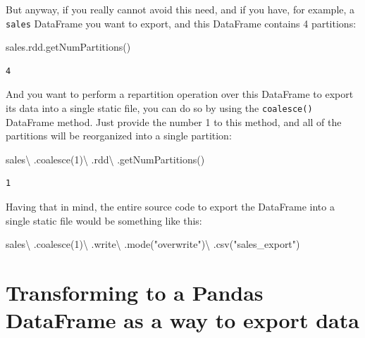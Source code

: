 \documentclass[
  11pt,
  letterpaper,
  DIV=11,
  numbers=noendperiod]{scrreprt}
\newenvironment{Shaded}{\begin{snugshade}}{\end{snugshade}}
\newcommand{\DecValTok}[1]{\textcolor[rgb]{0.68,0.00,0.00}{#1}}
\newcommand{\NormalTok}[1]{\textcolor[rgb]{0.00,0.23,0.31}{#1}}
\newcommand{\OperatorTok}[1]{\textcolor[rgb]{0.37,0.37,0.37}{#1}}
\newcommand{\StringTok}[1]{\textcolor[rgb]{0.13,0.47,0.30}{#1}}
\begin{document}
But anyway, if you really cannot avoid this need, and if you have, for
example, a \texttt{sales} DataFrame you want to export, and this
DataFrame contains 4 partitions:

\begin{Shaded}
\begin{Highlighting}[]
\NormalTok{sales.rdd.getNumPartitions()}
\end{Highlighting}
\end{Shaded}

\begin{verbatim}
4
\end{verbatim}

And you want to perform a repartition operation over this DataFrame to
export its data into a single static file, you can do so by using the
\texttt{coalesce()} DataFrame method. Just provide the number 1 to this
method, and all of the partitions will be reorganized into a single
partition:

\begin{Shaded}
\begin{Highlighting}[]
\NormalTok{sales}\OperatorTok{\textbackslash{}}
\NormalTok{    .coalesce(}\DecValTok{1}\NormalTok{)}\OperatorTok{\textbackslash{}}
\NormalTok{    .rdd}\OperatorTok{\textbackslash{}}
\NormalTok{    .getNumPartitions()}
\end{Highlighting}
\end{Shaded}

\begin{verbatim}
1
\end{verbatim}

Having that in mind, the entire source code to export the DataFrame into
a single static file would be something like this:

\begin{Shaded}
\begin{Highlighting}[]
\NormalTok{sales}\OperatorTok{\textbackslash{}}
\NormalTok{    .coalesce(}\DecValTok{1}\NormalTok{)}\OperatorTok{\textbackslash{}}
\NormalTok{    .write}\OperatorTok{\textbackslash{}}
\NormalTok{    .mode(}\StringTok{"overwrite"}\NormalTok{)}\OperatorTok{\textbackslash{}}
\NormalTok{    .csv(}\StringTok{"sales\_export"}\NormalTok{)}
\end{Highlighting}
\end{Shaded}

\section{Transforming to a Pandas DataFrame as a way to export
data}\label{transforming-to-a-pandas-dataframe-as-a-way-to-export-data}
\end{document}
